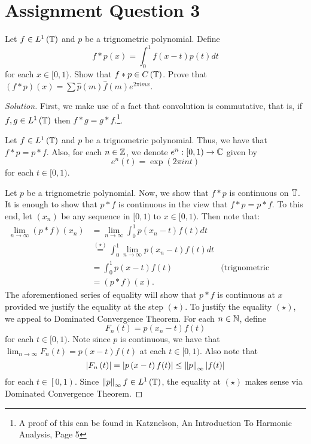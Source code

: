\section{Assignment Question 3}
\horz
Let $f \in L^{1} \left( \mathbb T \right)$ and $p$ be a trignometric polynomial. Define
\begin{equation*}
f * p (x) = \int_{0}^{1} f\left( x-t \right) p(t) dt
\end{equation*}
for each $x \in [0,1)$.
Show that $f * p \in C\left( \mathbb T \right)$.
Prove that $(f* p) \left( x \right) = \sum \hat{p} \left( m \right) \hat{f}\left( m \right) e^{2\pi i m x}$.
\horz

\begin{proof}[Solution]
First, we make use of a fact that convolution is commutative, that is, if $f,g \in L^{1} \left( \mathbb T \right)$ then $f * g  = g * f$.\footnote{A proof of this can be found in Katznelson, An Introduction To Harmonic Analysis, Page 5}.

Let $f \in L^{1} \left( \mathbb T \right)$ and $p$ be a trignometric polynomial. Thus, we have that $f * p = p *f$. Also, for each $n\in \mathbb Z$, we denote $e^{n} : [0,1) \to \mathbb C$ given by
\begin{equation*}
e^{n} \left( t \right) = \exp \left( 2\pi i n t \right)
\end{equation*}
for each $t\in [0,1)$.

Let $p$ be a trignometric polynomial. Now, we show that $f * p$ is continuous on $\mathbb T$. It is enough to show that $p * f$ is continuous in the view that $f * p = p * f$. To this end, let $\left( x_{n} \right) $ be any sequence in $[0,1)$ to $x \in [0,1)$. Then note that:
\begin{align*}
\lim_{n\to \infty} (p * f)\left( x_{n} \right) &= \lim_{n\to \infty} \int_{0}^{1} p \left( x_{n} - t \right) f\left( t \right) dt \\
&\stackrel{(\star)}{=} \int_{0}^{1} \lim_{n\to \infty} p\left( x_{n} -t \right) f\left( t \right) dt \\
&= \int_{0}^{1} p\left( x-t \right) f(t) & \text{(trignometric polynomials are continuous)} \\
&= (p*f) \left( x \right).
\end{align*}
The aforementioned series of equality will show that $p*f$ is continuous at $x$ provided we justify the equality at the step $\left( \star \right)$. To justify the equality $\left( \star \right)$, we appeal to Dominated Convergence Theorem. For each $n\in \mathbb N$, define
\begin{equation*}
F_{n} (t) = p\left( x_{n} - t \right) f(t)
\end{equation*}
for each $t \in [0,1)$. Note since $p$ is continuous, we have that $\lim_{n \to \infty} F_{n} (t) = p(x-t)f(t)$ at each $t \in [0,1)$. Also note that 
\begin{equation*}
\left\lvert F_{n} \left( t \right) \right\rvert = \left\lvert p\left( x-t \right) f(t) \right\rvert \le \left\lVert p \right\rVert_{\infty} \left\lvert f(t) \right\rvert
\end{equation*}
for each $t \in \left[ 0,1 \right)$. Since $\left\lVert p \right\rVert_{\infty} f \in L^{1} \left( \mathbb T \right)$, the equality at $\left( \star \right)$ makes sense via Dominated Convergence Theorem.


\end{proof}
